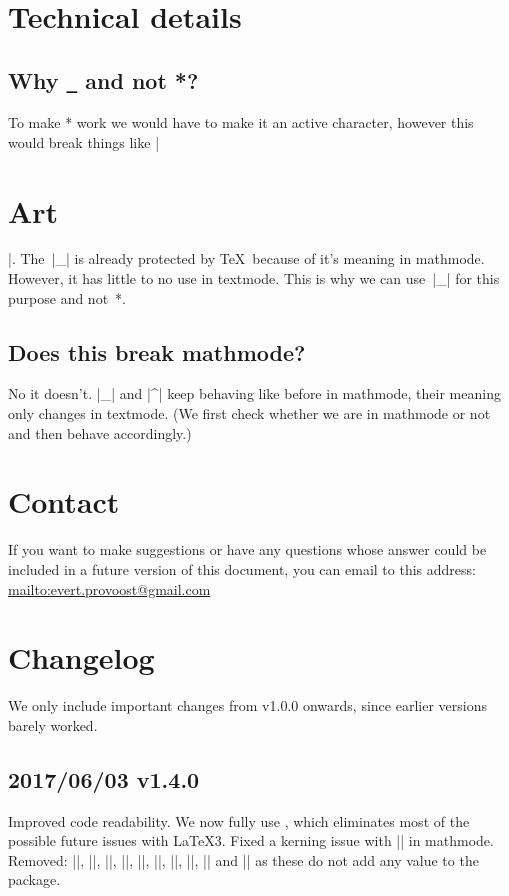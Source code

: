 \documentclass[11pt, cm-default]{l3doc}
\begin{document}
	\section{Technical details}
	\subsection{Why \texttt{\_} and not *?\label{Why?!}}
	To make * work we would have to make it an active character, however this would break things like |\section*{Art}|. The~|_| is already protected by \TeX\ because of it's meaning in mathmode. However, it has little to no use in textmode. This is why we can use~|_| for this purpose and not~*.
	
	\subsection{Does this break mathmode?}
	No it doesn't. |_| and |^| keep behaving like before in mathmode, their meaning only changes in textmode. (We first check whether we are in mathmode or not and then behave accordingly.)

	\section{Contact\label{contact}}
	If you want to make suggestions or have any questions whose answer could be included in a future version of this document, you can email to this address: \url{mailto:evert.provoost@gmail.com}
	\newpage
	
	\section{Changelog}
	We only include important changes from v1.0.0 onwards, since earlier versions barely worked.

	\subsection*{2017/06/03 v1.4.0}
	Improved code readability.
	We now fully use , which eliminates most of the possible future issues with \LaTeX3.
	Fixed a kerning issue with |\cir| in mathmode.
	Removed: |\setundact|, |\setundsub|, |\setciract|, |\setcirsup|, |\nrfamily|, |\nrshape|, |\nrseries|, |\setffamily|, |\setfshape| and |\setfseries| as these do not add any value to the package.
\end{document}
